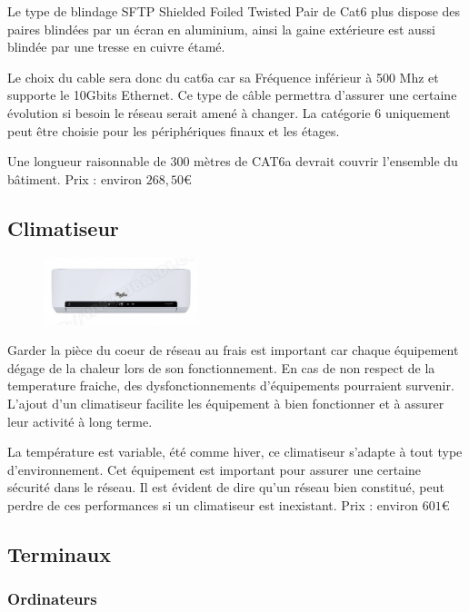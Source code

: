 Le type de blindage SFTP Shielded Foiled Twisted Pair de Cat6  plus dispose des paires blindées par un écran en aluminium, ainsi la gaine extérieure est aussi blindée par une tresse en cuivre étamé.

Le choix du cable sera donc du cat6a car sa Fréquence inférieur à 500 Mhz et supporte le 10Gbits Ethernet. Ce type de câble permettra d'assurer une certaine évolution si besoin le réseau serait amené à changer.
La catégorie 6 uniquement peut être choisie pour les périphériques finaux  et les étages.

Une longueur raisonnable de 300 mètres de CAT6a devrait couvrir l'ensemble du bâtiment.
Prix : environ $ 268,50  \euro $



\subsection{Climatiseur}

\begin{figure}[!ht]
    \center
    \includegraphics[width=0.4\textwidth]{./images/28.png}
\end{figure}

Garder la pièce du coeur de réseau au frais est important car chaque équipement dégage de la chaleur lors de son fonctionnement. En cas de non respect de la temperature fraiche, des dysfonctionnements d'équipements pourraient survenir. L'ajout d'un climatiseur facilite les équipement à bien fonctionner et à assurer leur activité à long terme.

La température est variable, été comme hiver, ce climatiseur s'adapte à tout type d'environnement.
Cet équipement est important pour assurer une certaine sécurité dans le réseau. Il est évident de dire qu'un réseau bien constitué, peut perdre de ces performances si un climatiseur est inexistant.
Prix : environ $ 601  \euro $



\subsection{Terminaux}

\subsubsection{Ordinateurs}



